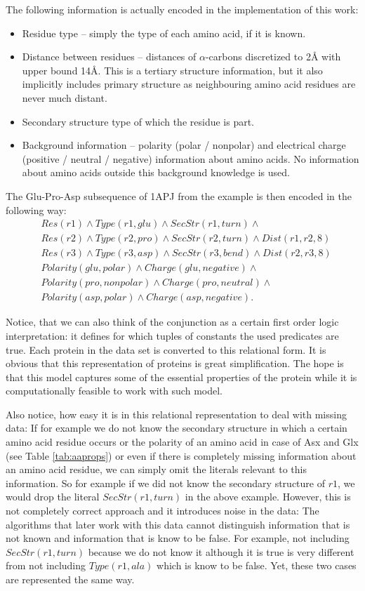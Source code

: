 \documentclass[11pt,twoside,a4paper]{book}
\begin{document}
\pagebreak
The following information is actually encoded in the implementation of this work:
\begin{itemize}
 \item Residue type -- simply the type of each amino acid, if it is known.
 \item Distance between residues -- distances of $\alpha$-carbons discretized to 2Å with upper bound 14Å.
 This is a tertiary structure information, but it also implicitly includes primary structure 
 as neighbouring amino acid residues are never much distant.
 \item Secondary structure type of which the residue is part.
 \item Background information -- polarity (polar / nonpolar) and electrical charge (positive / neutral / negative)
 information about amino acids.
 No information about amino acids outside this background knowledge is used.
\end{itemize}

The Glu-Pro-Asp subsequence of 1APJ from the example is then encoded in the following way:
\begin{align*}
&Res(r1) \land Type(r1, glu) \land SecStr(r1, turn) \land \\
&Res(r2) \land Type(r2, pro) \land SecStr(r2, turn) \land Dist(r1, r2, 8) \\
&Res(r3) \land Type(r3, asp) \land SecStr(r3, bend) \land Dist(r2, r3, 8) \\
&Polarity(glu, polar) \land Charge(glu, negative) \land \\
&Polarity(pro, nonpolar) \land Charge(pro, neutral) \land \\
&Polarity(asp, polar) \land Charge(asp, negative).
\end{align*}

Notice, that we can also think of the conjunction as a certain first order logic interpretation:
it defines for which tuples of constants the used predicates are true.
Each protein in the data set is converted to this relational form.
It is obvious that this representation of proteins is great simplification.
The hope is that this model captures some of the essential properties of the 
protein while it is computationally feasible to work with such model.

Also notice, how easy it is in this relational representation to deal with missing data:
If for example we do not know the secondary structure in which a certain amino acid 
residue occurs or the polarity of an amino acid in case of Asx and Glx (see Table \ref{tab:aaprops})
or even if there is completely missing information about an amino acid residue,
we can simply omit the literals relevant to this information.
So for example if we did not know the secondary structure of $r1$,
we would drop the literal $SecStr(r1, turn)$ in the above example.
However, this is not completely correct approach and it introduces noise in the data:
The algorithms that later work with this data cannot distinguish information
that is not known and information that is know to be false.
For example,
not including $SecStr(r1, turn)$ because we do not know it although it is true
is very different from not including $Type(r1, ala)$ which is know to be false.
Yet, these two cases are represented the same way.
\end{document}
